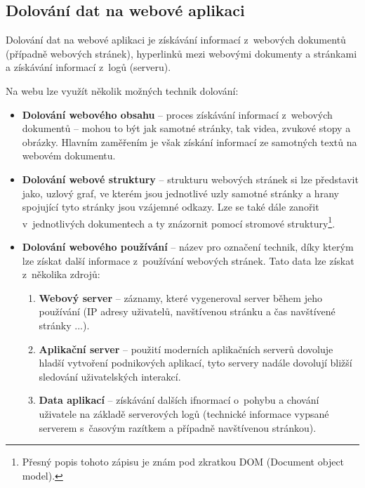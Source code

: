 \subsection{Dolování dat na webové aplikaci}
\par Dolování dat na webové aplikaci je získávání informací z~webových dokumentů (případně webových stránek), hyperlinků mezi webovými dokumenty a stránkami a získávání informací z~logů (serveru).

\par Na webu lze využít několik možných technik dolování:
\begin{itemize}
\item \textbf{Dolování webového obsahu} -- proces získávání informací z~webových dokumentů -- mohou to být jak samotné stránky, tak videa, zvukové stopy a obrázky. Hlavním zaměřením je však získání informací ze samotných textů na webovém dokumentu.
\item \textbf{Dolování webové struktury} -- strukturu webových stránek si lze představit jako, uzlový graf, ve kterém jsou jednotlivé uzly samotné stránky a hrany spojující tyto stránky jsou vzájemné odkazy. Lze se také dále zanořit v~jednotlivých dokumentech a ty znázornit pomocí stromové struktury\footnote{Přesný popis tohoto zápisu je znám pod zkratkou DOM (Document object model).}.
\item \textbf{Dolování webového používání} -- název pro označení technik, díky kterým lze získat další informace z~používání webových stránek. Tato data lze získat z~několika zdrojů:
\begin{enumerate}
  \item \textbf{Webový server} -- záznamy, které vygeneroval server během jeho používání (IP adresy uživatelů, navštívenou stránku a čas navštívené stránky ...).
  \item \textbf{Aplikační server} -- použití moderních aplikačních serverů dovoluje hladší vytvoření podnikových aplikací, tyto servery nadále dovolují bližší sledování uživatelských interakcí.
  \item \textbf{Data aplikací} --  získávání dalších ifnormací o~pohybu a chování uživatele na základě serverových logů (technické informace vypsané serverem s~časovým razítkem a případně navštívenou stránkou). \cite{minigbook}
\end{enumerate}
\end{itemize}


